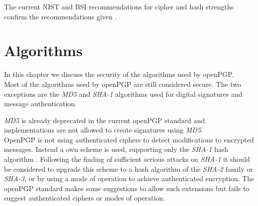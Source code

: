 The current NIST and BSI recommendations for cipher and hash strengths confirm the recommendations given \cite{keylenNIST} \cite{KeylenBSI}. 

\section{Algorithms}

In this chapter we discuss the security of the algorithms used by openPGP.  \\




Most of the algorithms used by openPGP are still considered secure. 
The two exceptions are the \textit{MD5} and \textit{SHA-1} algorithms used for digital signatures and message authentication. 

\textit{MD5} is already deprecated in the current openPGP standard \citep[section 14]{RFC4880} and implementations are not allowed to create signatures using \textit{MD5}.   \\

OpenPGP is not using authenticated ciphers to detect modifications to encrypted messages.
Instead a own scheme is used, supporting only the \textit{SHA-1} hash algorithm \citep[section 5.13]{RFC4880}. 
Following the finding of sufficient serious attacks on \textit{SHA-1} \cite{SHA1attack} it should be considered to upgrade this scheme to a hash algorithm of the \textit{SHA-2} family or \textit{SHA-3}, or by using a mode of operation to achieve authenticated encryption. The openPGP standard makes some suggestions to allow such extensions \citep[section 13.11]{RFC4880} but fails to suggest authenticated ciphers or modes of operation.






